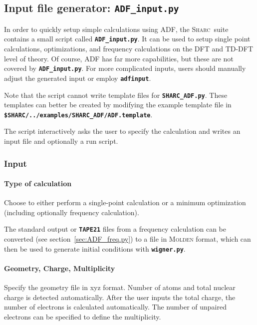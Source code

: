 \documentclass[a4paper,10pt,DIV=15,openany]{scrbook}
\newcommand{\sharc}{\textsc{Sharc}}
\newcommand{\ttt}[1]{\textbf{\texttt{#1}}}
\begin{document}
\subsection{Input file generator: \ttt{ADF\_input.py}}\label{sec:ADF_input.py}

In order to quickly setup simple calculations using ADF, the \sharc\ suite contains a small script called \ttt{ADF\_input.py}. It can be used to setup single point calculations, optimizations, and frequency calculations on the DFT and TD-DFT level of theory. Of course, ADF has far more capabilities, but these are not covered by \ttt{ADF\_input.py}. For more complicated inputs, users should manually adjust the generated input or employ \ttt{adfinput}.

Note that the script cannot write template files for \ttt{SHARC\_ADF.py}.
These templates can better be created by modifying the example template file in \ttt{\$SHARC/../examples/SHARC\_ADF/ADF.template}.

The script interactively asks the user to specify the calculation and writes an input file and optionally a run script.

\subsubsection{Input}

\paragraph{Type of calculation}

Choose to either perform a single-point calculation or a minimum optimization (including optionally frequency calculation).

The standard output or \ttt{TAPE21} files from a frequency calculation can be converted (see section~\ref{sec:ADF_freq.py}) to a file in \textsc{Molden} format, which can then be used to generate initial conditions with \ttt{wigner.py}.

\paragraph{Geometry, Charge, Multiplicity}

Specify the geometry file in xyz format. Number of atoms and total nuclear charge is detected automatically. After the user inputs the total charge, the number of electrons is calculated automatically. The number of unpaired electrons can be specified to define the multiplicity.
\end{document}
